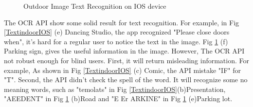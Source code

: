 \documentclass[11pt]{ucscthesis}
\begin{document}
\begin{figure}
  \hfill
\caption{Outdoor Image Text Recognition on IOS device}
\label{TextoutdoorIOS}
\end{figure}

The OCR API show some solid result for text recognition. For example, in Fig \ref{TextindoorIOS} (e) Dancing Studio, the app recognized "Please close doors when", it's hard for a regular user to notice the text in the image. Fig \ref{TextoutdoorIOS} (f) Parking sign, gives the useful information in the image. However, The OCR API not robust enough for blind users. First, it will return misleading information. For example, As shown in Fig \ref{TextindoorIOS} (c) Comic, the API mistake "IF" for "T". Second, the API didn't check the spell of the word. It will recognize some no meaning words, such as "temolats" in Fig \ref{TextindoorIOS}(b)Presentation, "AEEDENT" in Fig \ref{TextoutdoorIOS} (b)Road and "E Er ARKINE" in Fig \ref{TextoutdoorIOS} (e)Parking lot.
\end{document}
